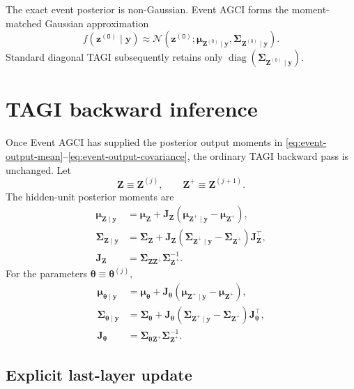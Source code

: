 \documentclass[11pt]{article}
\newcommand{\Normal}{\mathcal{N}}
\newcommand{\diag}{\operatorname{diag}}
\newcommand{\trans}{\intercal}
\newcommand{\Olayer}{\mathtt{O}}
\begin{document}
The exact event posterior is non-Gaussian.  Event AGCI forms the
moment-matched Gaussian approximation
\begin{equation}
 f(\bm z^{(\Olayer)}\mid\bm y)
 \approx
 \Normal\!\left(
 \bm z^{(\Olayer)};
 \bm\mu_{\bm Z^{(\Olayer)}\mid\bm y},
 \bm\Sigma_{\bm Z^{(\Olayer)}\mid\bm y}
 \right).
 \label{eq:moment-projection}
\end{equation}
Standard diagonal TAGI subsequently retains only
$\diag(\bm\Sigma_{\bm Z^{(\Olayer)}\mid\bm y})$.

\section{TAGI backward inference}

Once Event AGCI has supplied the posterior output moments in
\eqref{eq:event-output-mean}--\eqref{eq:event-output-covariance}, the ordinary
TAGI backward pass is unchanged.  Let
\begin{equation}
 \bm Z\equiv\bm Z^{(j)},
 \qquad
 \bm Z^+\equiv\bm Z^{(j+1)}.
\end{equation}
The hidden-unit posterior moments are
\begin{align}
 \bm\mu_{\bm Z\mid\bm y}
 &=
 \bm\mu_{\bm Z}
 +
 \mathbf J_{\bm Z}
 \left(
 \bm\mu_{\bm Z^+\mid\bm y}-\bm\mu_{\bm Z^+}
 \right),
 \\
 \bm\Sigma_{\bm Z\mid\bm y}
 &=
 \bm\Sigma_{\bm Z}
 +
 \mathbf J_{\bm Z}
 \left(
 \bm\Sigma_{\bm Z^+\mid\bm y}-\bm\Sigma_{\bm Z^+}
 \right)
 \mathbf J_{\bm Z}^\trans,
 \\
 \mathbf J_{\bm Z}
 &=
 \bm\Sigma_{\bm Z\bm Z^+}
 \bm\Sigma_{\bm Z^+}^{-1}.
 \label{eq:event-rts-hidden}
\end{align}
For the parameters $\bm\theta\equiv\bm\theta^{(j)}$,
\begin{align}
 \bm\mu_{\bm\theta\mid\bm y}
 &=
 \bm\mu_{\bm\theta}
 +
 \mathbf J_{\bm\theta}
 \left(
 \bm\mu_{\bm Z^+\mid\bm y}-\bm\mu_{\bm Z^+}
 \right),
 \\
 \bm\Sigma_{\bm\theta\mid\bm y}
 &=
 \bm\Sigma_{\bm\theta}
 +
 \mathbf J_{\bm\theta}
 \left(
 \bm\Sigma_{\bm Z^+\mid\bm y}-\bm\Sigma_{\bm Z^+}
 \right)
 \mathbf J_{\bm\theta}^\trans,
 \\
 \mathbf J_{\bm\theta}
 &=
 \bm\Sigma_{\bm\theta\bm Z^+}
 \bm\Sigma_{\bm Z^+}^{-1}.
 \label{eq:event-rts-parameters}
\end{align}

\subsection{Explicit last-layer update}
\end{document}
